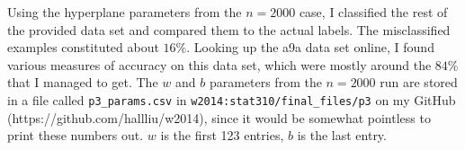 \documentclass{article}
\begin{document}
Using the hyperplane parameters from the $n=2000$ case, I classified the rest of the provided data set and compared them to the actual labels. The misclassified examples constituted about $16\%$. Looking up the a9a data set online, I found various measures of accuracy on this data set, which were mostly around the $84\%$ that I managed to get. The $w$ and $b$ parameters from the $n=2000$ run are stored in a file called \verb|p3_params.csv| in \verb|w2014:stat310/final_files/p3| on my GitHub (https://github.com/hallliu/w2014), since it would be somewhat pointless to print these numbers out. $w$ is the first 123 entries, $b$ is the last entry.
\end{document}
